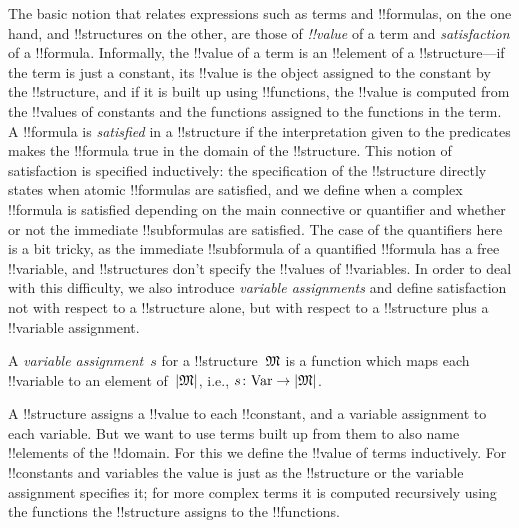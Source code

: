 \documentclass[../../include/open-logic-section]{subfiles}
\begin{document}


\begin{explain}
The basic notion that relates expressions such as terms and
!!{formula}s, on the one hand, and !!{structure}s on the other, are
those of \emph{!!{value}} of a term and \emph{satisfaction} of a
!!{formula}.  Informally, the !!{value} of a term is an !!{element} of
a !!{structure}---if the term is just a constant, its !!{value} is the
object assigned to the constant by the !!{structure}, and if it is
built up using !!{function}s, the !!{value} is computed from the
!!{value}s of constants and the functions assigned to the functions in
the term.  A !!{formula} is \emph{satisfied} in a !!{structure} if the
interpretation given to the predicates makes the !!{formula} true in
the domain of the !!{structure}. This notion of satisfaction is
specified inductively: the specification of the !!{structure} directly
states when atomic !!{formula}s are satisfied, and we define when a
complex !!{formula} is satisfied depending on the main connective or
quantifier and whether or not the immediate !!{subformula}s are
satisfied. The case of the quantifiers here is a bit tricky, as the
immediate !!{subformula} of a quantified !!{formula} has a free
!!{variable}, and !!{structure}s don't specify the !!{value}s of
!!{variable}s.  In order to deal with this difficulty, we also
introduce \emph{variable assignments} and define satisfaction not with
respect to a !!{structure} alone, but with respect to a !!{structure}
plus a !!{variable} assignment.
\end{explain}

\begin{defn}
A \emph{variable assignment}~$s$ for a !!{structure}~$\mathfrak M$ is a
function which maps each !!{variable} to an element of~$\left| \mathfrak M \right|$,
i.e., $s\colon \mathrm{Var} \to \left| \mathfrak M \right|$.
\end{defn}

\begin{explain}
A !!{structure} assigns a !!{value} to each !!{constant}, and a
variable assignment to each variable.  But we want to use terms built
up from them to also name !!{element}s of the !!{domain}.  For this we
define the !!{value} of terms inductively. For !!{constant}s and
variables the value is just as the !!{structure} or the variable
assignment specifies it; for more complex terms it is computed
recursively using the functions the !!{structure} assigns to the
!!{function}s.
\end{explain}
\end{document}
